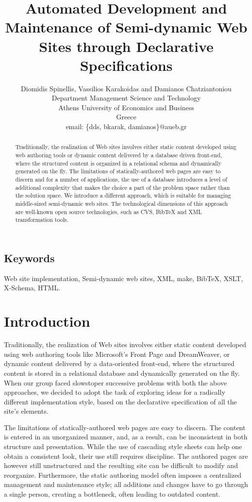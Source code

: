 \documentclass[10pt]{article}
\title{Automated Development and Maintenance of Semi-dynamic Web Sites through Declarative Specifications}
\author{Diomidis Spinellis, Vassilios Karakoidas and Damianos Chatziantoniou\\
Department Management Science and Technology\\
Athens University of Economics and Business\\
Greece\\
email: \{dds, bkarak, damianos\}@aueb.gr}
\date{}
\begin{document}
\maketitle

\begin{abstract}
\noindent
Traditionally, the realization of Web sites involves either
static content developed using web authoring tools or dynamic
content delivered by a database driven front-end,
where the structured content is organized
in a relational schema and dynamically generated on the fly.
The limitations of statically-authored web pages are easy to discern and
for a number of applications, the use of a database
introduces a level of additional complexity that
makes the choice a part of the problem space rather than the solution space.
We introduce a different approach, which is suitable for managing 
middle-sized semi-dynamic web sites. The technological dimensions of this
approach are well-known open source technologies, such as {\sc CVS}, BibTeX 
and {\sc XML} transformation tools.
\end{abstract}

\subsection*{Keywords}
Web site implementation, Semi-dynamic web sites, {\sc XML}, make, BibTeX, {\sc XSLT}, X-Schema, {\sc HTML}.

\section{Introduction}
\label{sec:intro}
Traditionally, the realization of Web sites involves either
static content developed using web authoring tools like
Microsoft's Front Page and DreamWeaver, or dynamic
content delivered by a data-oriented front-end,
where the structured content is stored in a relational database 
and dynamically generated on the fly.
When our group faced slowstoper successive problems with both the above approaches,
we decided to adopt the task of exploring ideas for a radically different
implementation style, based on the declarative specification
of all the site's elements.

The limitations of statically-authored web pages are easy to discern.
The content is entered in an unorganized manner, and, as a result,
can be inconsistent in both structure and presentation.
While the use of cascading style sheets can help one obtain a
consistent look, their use still requires discipline.
The authored pages are however still unstructured and the resulting
site can be difficult to modify and reorganize.
Furthermore, the static authoring model often imposes a centralized
management and maintenance style;
all additions and changes have to go through a single person,
creating a bottleneck, often leading to outdated content.
\end{document}
